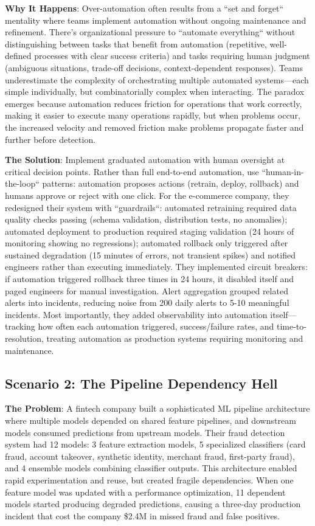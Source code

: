 \textbf{Why It Happens}: Over-automation often results from a ``set and forget`` mentality where teams implement automation without ongoing maintenance and refinement. There's organizational pressure to ``automate everything`` without distinguishing between tasks that benefit from automation (repetitive, well-defined processes with clear success criteria) and tasks requiring human judgment (ambiguous situations, trade-off decisions, context-dependent responses). Teams underestimate the complexity of orchestrating multiple automated systems---each simple individually, but combinatorially complex when interacting. The paradox emerges because automation reduces friction for operations that work correctly, making it easier to execute many operations rapidly, but when problems occur, the increased velocity and removed friction make problems propagate faster and further before detection.

\textbf{The Solution}: Implement graduated automation with human oversight at critical decision points. Rather than full end-to-end automation, use ``human-in-the-loop`` patterns: automation proposes actions (retrain, deploy, rollback) and humans approve or reject with one click. For the e-commerce company, they redesigned their system with ``guardrails``: automated retraining required data quality checks passing (schema validation, distribution tests, no anomalies); automated deployment to production required staging validation (24 hours of monitoring showing no regressions); automated rollback only triggered after sustained degradation (15 minutes of errors, not transient spikes) and notified engineers rather than executing immediately. They implemented circuit breakers: if automation triggered rollback three times in 24 hours, it disabled itself and paged engineers for manual investigation. Alert aggregation grouped related alerts into incidents, reducing noise from 200 daily alerts to 5-10 meaningful incidents. Most importantly, they added observability into automation itself---tracking how often each automation triggered, success/failure rates, and time-to-resolution, treating automation as production systems requiring monitoring and maintenance.

\subsection{Scenario 2: The Pipeline Dependency Hell}

\textbf{The Problem}: A fintech company built a sophisticated ML pipeline architecture where multiple models depended on shared feature pipelines, and downstream models consumed predictions from upstream models. Their fraud detection system had 12 models: 3 feature extraction models, 5 specialized classifiers (card fraud, account takeover, synthetic identity, merchant fraud, first-party fraud), and 4 ensemble models combining classifier outputs. This architecture enabled rapid experimentation and reuse, but created fragile dependencies. When one feature model was updated with a performance optimization, 11 dependent models started producing degraded predictions, causing a three-day production incident that cost the company \$2.4M in missed fraud and false positives.

